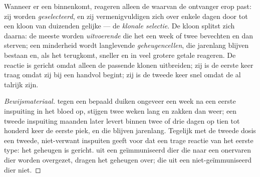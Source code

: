 \begin{proposition}\label{prop:g12:adaptive-immunity:selection}
Wanneer er een  binnenkomt, reageren alleen de  waarvan
de ontvanger erop past: zij worden \emph{geselecteerd}, en zij
vermenigvuldigen zich over enkele dagen door  tot een kloon van
duizenden gelijke  --- de \emph{klonale selectie}.
De kloon splitst zich daarna: de meeste  worden
\emph{uitvoerende } die het  een week of twee bevechten en
dan sterven; een minderheid wordt langlevende
\emph{geheugencellen}, die jarenlang blijven bestaan
en, als het  terugkomt, sneller en in veel grotere getale
reageren. De reactie is gericht omdat alleen de passende klonen uitbreiden;
zij is de eerste keer traag omdat zij bij een handvol  begint; zij
is de tweede keer snel omdat de  al talrijk zijn.
\end{proposition}
\begin{proof}[Bewijsmateriaal]
 tegen een bepaald  duiken ongeveer een week na een
eerste inspuiting in het bloed op, stijgen twee weken lang en zakken dan
weer; een tweede inspuiting maanden later levert binnen twee of drie dagen
 op tien tot honderd keer de eerste piek, en die blijven
jarenlang. Tegelijk met de tweede dosis een tweede, niet-verwant 
inspuiten geeft voor dat  een trage reactie van het eerste type:
het geheugen is gericht.  uit een geïmmuniseerd dier die naar
een onervaren dier worden overgezet, dragen het geheugen over; die uit een
niet-geïmmuniseerd dier niet.
\end{proof}

